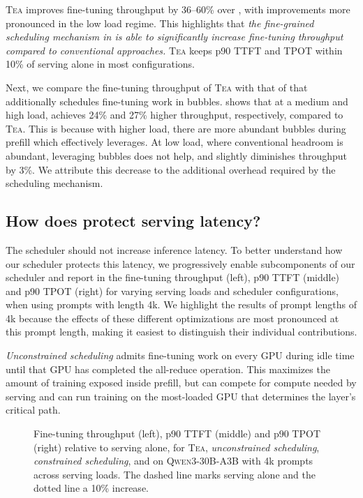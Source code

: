 \textsc{Tea} improves fine-tuning throughput by 36--60\% over \emph{\cfgColo}, with improvements more pronounced in the low load regime.
This highlights that \emph{the fine-grained scheduling mechanism in \sys is able to significantly increase fine-tuning throughput compared to conventional approaches.} \textsc{Tea} keeps p90 \ac{TTFT} and \ac{TPOT} within 10\% of serving alone in most configurations.

Next, we compare the fine-tuning throughput of \textsc{Tea} with that of \sys that additionally schedules fine-tuning work in bubbles.
 shows that at a medium and high load, \sys achieves 24\% and 27\% higher throughput, respectively, compared to \textsc{Tea}.
This is because with higher load, there are more abundant bubbles during prefill which \sys effectively leverages.
At low load, where conventional headroom is abundant, leveraging bubbles does not help, and slightly diminishes throughput by 3\%.
We attribute this decrease to the additional overhead required by the \sys scheduling mechanism.

\subsection{How does \sys protect serving latency?}
\label{sec:eval-latency}

The \sys scheduler should not increase inference latency.
To better understand how our scheduler protects this latency, we progressively enable subcomponents of our scheduler and report in  the fine-tuning throughput (left), p90 \ac{TTFT} (middle) and p90 \ac{TPOT} (right) for varying serving loads and scheduler configurations, when using prompts with length 4k.
We highlight the results of prompt lengths of 4k because the effects of these different optimizations are most pronounced at this prompt length, making it easiest to distinguish their individual contributions.

\emph{Unconstrained scheduling} admits fine-tuning work on every GPU during idle time until that GPU has completed the all-reduce operation.
This maximizes the amount of training exposed inside prefill, but can compete for compute needed by serving and can run training on the most-loaded GPU that determines the layer's critical path.

\begin{figure}[t]
  \centering
  \caption{Fine-tuning throughput (left), p90 \ac{TTFT} (middle) and p90 \ac{TPOT} (right) relative to serving alone, for \textsc{Tea}, \emph{unconstrained scheduling}, \emph{constrained scheduling}, and \sys on \textsc{Qwen3-30B-A3B} with 4k prompts across serving loads. The dashed line marks serving alone and the dotted line a 10\% increase.}
  \label{fig:eval-latency-ablation}
\end{figure}

